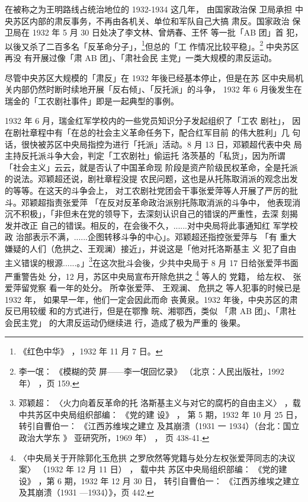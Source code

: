 在被称之为王明路线占统治地位的 1932-1934 这几年， 由国家政治保 卫局承担
中央苏区内部的肃反事务，不再由各机关、单位和军队自己大搞 肃反。国家政治
保卫局在 1932 年 5 月 30 日处决了李文林、曾炳春、王怀 等一批「AB 团」首
犯，以後又杀了二百多名「反革命分子」，\footnote{《红色中华》 ，1932 年
11 月 7 日。}但总的「工 作情况比较平稳」。\footnote{李一氓： 《模糊的荧
屏——李一氓回忆录》 （北京：人民出版社，1992 年） ，页 159.} 中央苏区再没
有开展过像「肃 AB 团」、「肃社会民 主党」一类大规模的肃反运动。

尽管中央苏区大规模的「肃反」在 1932 年後已经基本停止，但是在苏
区中央局机关内部仍然时断时续地开展「反右倾」、「反托派」的斗争，
1932 年 6 月後发生在瑞金的「工农剧社事件」即是一起典型的事例。

1932 年 6 月，瑞金红军学校内的一些党员知识分子发起组织了「工农 剧社」，
因在剧社章程中有「在总的社会主义革命任务下，配合红军目前 的伟大胜利」几
句话，很快被苏区中央局指控为进行「托派」活动。8 月 13 日，邓颖超代表中央
局主持反托派斗争大会，判定「工农剧社」偷运托 洛茨基的「私货」，因为所谓
「社会主义」云云，就是否认了中国革命现 阶段是资产阶级民权革命，全是托派
的说法。邓颖超还说，剧社章程没提 农民问题，这也是从托陈取消派的观念出发
的等等。在这天的斗争会上， 对工农剧社党团会干事张爱萍等人开展了严厉的批
斗。邓颖超指责张爱萍 「在反对反革命政治派别托陈取消派的斗争中， 他表现消
沉不积极」，「非但未在党的领导下，去深刻认识自己的错误的严重性，去深
刻揭发并改正 自己的错误。相反的，在会後不久，......对中央局将此事通知红
军学校政 治部表示不满，......企图转移斗争的中心」。邓颖超还指控张爱萍与
「有 重大嫌疑的人们（危拱之、王观澜）接近」，并说这是「他对托洛斯基主 义
犯了自由主义错误的根源......。」\footnote{邓颖超： 〈火力向着反革命的托
洛斯基主义与对它的腐朽的自由主义〉 ，载中共苏区中央局组织部编： 《党的建
设》 ， 第 5 期，1932 年 10 月 25 日，转引自曹伯一： 《江西苏维埃之建立
及其崩溃（1931 一 1934）（台北：国立政治大学东 》 亚研究所，1969 年） ，
页 438-41.}在这次批斗会後，少共中央局于 8 月 17 日给张爱萍书面严重警告处
分，12 月，苏区中央局宣布开除危拱之 \footnote{〈中央局关于开除郭化玉危拱
之罗欣然等党籍与处分左权张爱萍同志的决议案〉 （1932 年 12 月 11 日） ，
载中共 苏区中央局组织部编： 《党的建设》 ，第 6 期，1932 年 12 月 30 日，
转引自曹伯一： 《江西苏维埃之建立及其崩溃（1931 —1934）》，页 442.} 等人的
党籍， 给左权、 张爱萍留党察 看一年的处分。 所幸张爱萍、 王观澜、 危拱之
等人犯事的时候已是 1932 年， 如果早一年，他们一定会因此而命 丧黄泉。1932
年後，中央苏区的肃反已用较缓 和的方式进行，但是在鄂豫 皖、湘鄂西，类似
「肃 AB 团」、「肃社会民主党」 的大肃反运动仍继续进 行，造成了极为严重的
後果。


